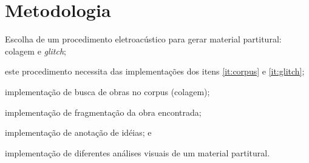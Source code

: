 \section{Metodologia}\label{sec:metodo}

\begin{inparaenum}
\item Escolha de um procedimento eletroacústico para gerar material partitural: colagem e \emph{glitch};
\item este procedimento necessita das implementações dos itens \ref{it:corpus} e \ref{it:glitch};
\item\label{it:corpus} implementação de busca de obras no corpus (colagem);
\item\label{it:glitch} implementação de fragmentação da obra encontrada;
\item implementação de anotação de idéias; e
\item implementação de diferentes análises visuais de um material partitural.
\end{inparaenum}